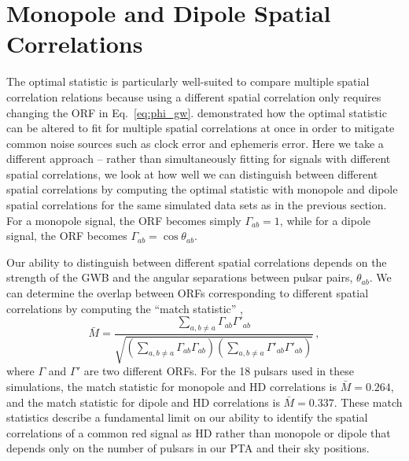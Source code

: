 \documentclass[twocolumn,aps,prd,superscriptaddress]{revtex4-1}
\begin{document}
\section{Monopole and Dipole Spatial Correlations}
\label{sec:spatial}

The optimal statistic is particularly well-suited 
to compare multiple spatial correlation relations 
because using a different spatial correlation only requires changing the ORF 
in Eq.~\eqref{eq:phi_gw}. 
\citet{thk+2016} demonstrated how the optimal statistic can be altered to fit for 
multiple spatial correlations at once in order to mitigate common noise sources such as 
clock error and ephemeris error. 
Here we take a different approach -- rather than simultaneously fitting 
for signals with different spatial correlations, 
we look at how well we can distinguish between different spatial correlations 
by computing the optimal statistic with monopole and dipole spatial correlations 
for the same simulated data sets as in the previous section. 
For a monopole signal, the ORF becomes simply
$\Gamma_{ab} = 1$, 
while for a dipole signal, the ORF becomes
$\Gamma_{ab} = \cos\theta_{ab}$.

Our ability to distinguish between different spatial correlations 
depends on the strength of the GWB 
and the angular separations between pulsar pairs, $\theta_{ab}$. 
We can determine the overlap between ORFs corresponding to different spatial correlations 
by computing the ``match statistic'' \citep{cs2016},
\begin{equation}
	\bar{M} = \frac{\sum_{a,b \neq a} \Gamma_{ab} \Gamma'_{ab}}{\sqrt{ \left( \sum_{a, b \neq a} \Gamma_{ab} \Gamma_{ab} \right) \left( \sum_{a, b \neq a} \Gamma'_{ab} \Gamma'_{ab} \right)}} \,,
\end{equation}
where $\Gamma$ and $\Gamma'$ are two different ORFs. 
For the 18 pulsars used in these simulations, the 
match statistic for monopole and HD correlations is $\bar{M} = 0.264$, 
and the match statistic for dipole and HD correlations is $\bar{M} = 0.337$. 
These match statistics describe a fundamental limit on our ability 
to identify the spatial correlations of a common red signal as HD 
rather than monopole or dipole 
that depends only on the number of pulsars in our PTA and their sky positions.
\end{document}
